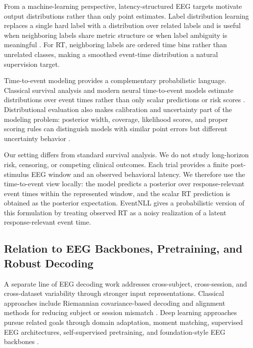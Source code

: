 From a machine-learning perspective, latency-structured EEG targets motivate output distributions rather than only point estimates. Label distribution learning replaces a single hard label with a distribution over related labels and is useful when neighboring labels share metric structure or when label ambiguity is meaningful \citep{Geng2016}. For RT, neighboring labels are ordered time bins rather than unrelated classes, making a smoothed event-time distribution a natural supervision target.

Time-to-event modeling provides a complementary probabilistic language. Classical survival analysis and modern neural time-to-event models estimate distributions over event times rather than only scalar predictions or risk scores \citep{Cox1972,Lee2018}. Distributional evaluation also makes calibration and uncertainty part of the modeling problem: posterior width, coverage, likelihood scores, and proper scoring rules can distinguish models with similar point errors but different uncertainty behavior \citep{Haider2020,Chapfuwa2023}.

Our setting differs from standard survival analysis. We do not study long-horizon risk, censoring, or competing clinical outcomes. Each trial provides a finite post-stimulus EEG window and an observed behavioral latency. We therefore use the time-to-event view locally: the model predicts a posterior over response-relevant event times within the represented window, and the scalar RT prediction is obtained as the posterior expectation. EventNLL gives a probabilistic version of this formulation by treating observed RT as a noisy realization of a latent response-relevant event time.

\subsection{Relation to EEG Backbones, Pretraining, and Robust Decoding}

A separate line of EEG decoding work addresses cross-subject, cross-session, and cross-dataset variability through stronger input representations. Classical approaches include Riemannian covariance-based decoding and alignment methods for reducing subject or session mismatch \citep{Barachant2012,Jayaram2016,Zanini2018,HeWu2020}. Deep learning approaches pursue related goals through domain adaptation, moment matching, supervised EEG architectures, self-supervised pretraining, and foundation-style EEG backbones \citep{Ganin2016,Sun2016,Kostas2021,Wang2024,Jiang2024,Chen2024,Wang2025,Ouahidi2025,Yue2025}.

